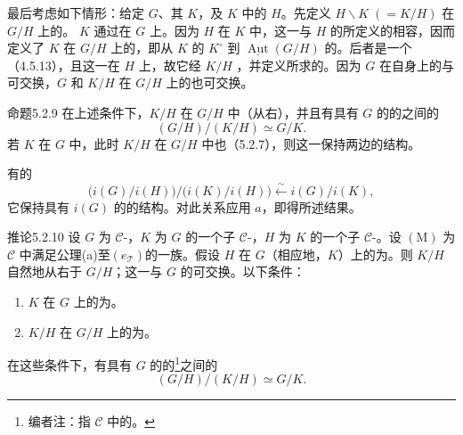 最后考虑如下情形：给定 $G$、其 $K$，及 $K$ 中的 $H$。先定义 $H\backslash K\;(=K/H)$ 在 $G/H$ 上的。 $K$ 通过在 $G$ 上。因为 $H$ 在 $K$ 中，这一与 $H$ 的所定义的相容，因而定义了 $K$ 在 $G/H$ 上的，即从 $K$ 的 $K^{\circ}$ 到 $\underline{\operatorname{Aut}}(G/H)$ 的。后者是一个（4.5.13），且这一在 $H$ 上，故它经 $K/H$ ，并定义所求的。因为 $G$ 在自身上的与可交换，$G$ 和 $K/H$ 在 $G/H$ 上的也可交换。
\begin{SGAresult}{命题}{5.2.9}
在上述条件下，$K/H$ 在 $G/H$ 中（从右），并且有具有 $G$ 的的之间的
\[
(G/H)/(K/H)\simeq G/K.
\]
若 $K$ 在 $G$ 中，此时 $K/H$ 在 $G/H$ 中也（5.2.7），则这一保持两边的结构。
\end{SGAresult}
有的
\[
\bigl(i(G)/i(H)\bigr)\big/\bigl(i(K)/i(H)\bigr)
\xleftarrow{\sim}i(G)/i(K),
\]
它保持具有 $i(G)$ 的的结构。对此关系应用 $a$，即得所述结果。
\begin{SGAresult}{推论}{5.2.10}
设 $G$ 为 $\mathcal C$-，$K$ 为 $G$ 的一个子 $\mathcal C$-，$H$ 为 $K$ 的一个子 $\mathcal C$-。设 $(\mathrm M)$ 为 $\mathcal C$ 中满足公理(a)至$(e_{\mathcal T})$的一族。假设 $H$ 在 $G$（相应地，$K$）上的为。则 $K/H$ 自然地从右于 $G/H$；这一与 $G$ 的可交换。以下条件：
\begin{enumerate}
\item[(i)] $K$ 在 $G$ 上的为。
\item[(ii)] $K/H$ 在 $G/H$ 上的为。
\end{enumerate}
在这些条件下，有具有 $G$ 的的\footnote{编者注：指 $\mathcal C$ 中的。}之间的
\[
(G/H)/(K/H)\simeq G/K.
\]
\end{SGAresult}
